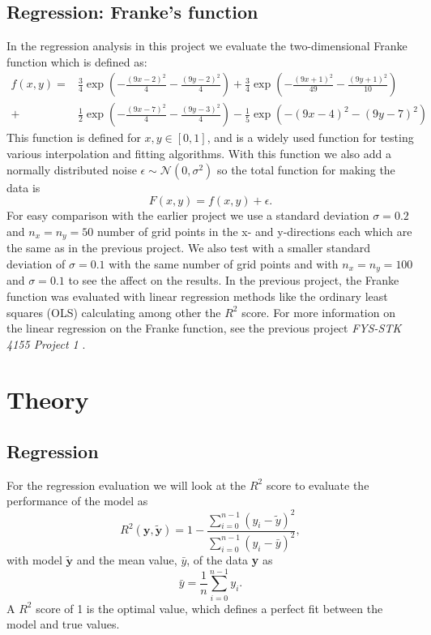 \documentclass[12pt,a4paper,english]{article}
\begin{document}
\subsection{Regression: Franke's function}
\label{subsect:franke_data}
In the regression analysis in this project we evaluate the two-dimensional Franke function which is defined as:
\begin{align}
\label{eq:Franke_func}
f(x,y)=&\frac{3}{4}\exp\left(-\frac{(9x-2)^2}{4}-\frac{(9y-2)^2}{4}\right)+
\frac{3}{4}\exp\left(-\frac{(9x+1)^2}{49}-\frac{(9y+1)^2}{10}\right)\\ 
+& \frac{1}{2}\exp\left(-\frac{(9x-7)^2}{4}-\frac{(9y-3)^2}{4}\right)- \frac{1}{5}\exp\left(-(9x-4)^2-(9y-7)^2\right) \nonumber
\end{align}
This function is defined for $x,y\in[0,1]$, and is a widely used function for testing various interpolation and fitting algorithms. With this function we also add a normally distributed noise $\epsilon\sim \mathcal{N}(0,\sigma^2)$ so the total function for making the data is
\begin{equation*}
F(x,y)=f(x,y)+\epsilon.
\end{equation*}
For easy comparison with the earlier project \cite{proj1} we use a standard deviation $\sigma=0.2$ and $n_x=n_y=50$ number of grid points in the x- and y-directions each which are the same as in the previous project. We also test with a smaller standard deviation of $\sigma=0.1$ with the same number of grid points and with $n_x=n_y=100$ and $\sigma=0.1$ to see the affect on the results. In the previous project, the Franke function was evaluated with linear regression methods like the ordinary least squares (OLS) calculating among other the $R^2$ score. For more information on the linear regression on the Franke function, see the previous project \textit{FYS-STK 4155 Project 1} \cite{proj1}.

\section{Theory}
\label{sect:Theory}
\subsection{Regression}
\label{subsect:Regression}
For the regression evaluation we will look at the $R^2$ score to evaluate the performance of the model as
\begin{equation}
\label{eq:R2_score}
R^2(\textbf{y},\tilde{\textbf{y}})=1-\frac{\sum_{i=0}^{n-1}(y_i-\tilde{y})^2}{\sum_{i=0}^{n-1}(y_i-\bar{y})^2},
\end{equation}
with model $\tilde{\textbf{y}}$ and the mean value, $\bar{y}$, of the data \textbf{y} as
\[\bar{y}=\frac{1}{n}\sum_{i=0}^{n-1}y_i.\]
A $R^2$ score of 1 is the optimal value, which defines a perfect fit between the model and true values.
\end{document}

